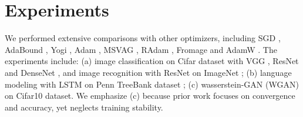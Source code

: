 \documentclass{article}
\begin{document}
\section{Experiments}
We performed extensive comparisons with other optimizers, including SGD \cite{sutskever2013importance}, AdaBound \cite{luo2019adaptive}, Yogi \cite{zaheer2018adaptive}, Adam \cite{kingma2014adam}, MSVAG \cite{balles2017dissecting}, RAdam \cite{liu2019variance}, Fromage \cite{bernstein2020distance} and AdamW \cite{loshchilov2017decoupled}. The experiments include: (a) image classification on Cifar dataset \cite{krizhevsky2009learning} with VGG \cite{simonyan2014very}, ResNet \cite{he2016deep} and DenseNet \cite{huang2017densely}, and image recognition with ResNet on ImageNet \cite{deng2009imagenet}; (b) language modeling with LSTM \cite{ma2015long} on Penn TreeBank dataset \cite{marcus1993building}; (c) wasserstein-GAN (WGAN) \cite{arjovsky2017wasserstein} on Cifar10 dataset. 
We emphasize (c) because prior work focuses on convergence and accuracy, yet neglects training stability.
\end{document}
